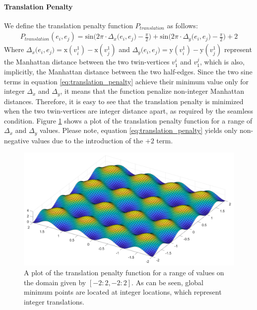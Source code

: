 \paragraph{Translation Penalty}
We define the translation penalty function $P_{translation}$ as follows:
\begin{equation}\label{eq:translation_penalty}
\begin{split}
P_{translation}\left(e_i,e_j\right) = \mathrm{sin} \Big( 2\pi\cdot\Delta_x\big(e_i,e_j\big) - \frac{\pi}{2}\Big) + \mathrm{sin} \Big( 2\pi\cdot\Delta_y\big(e_i,e_j\big) - \frac{\pi}{2}\Big) + 2
\end{split}
\end{equation}
Where $\Delta_x\big(e_i,e_j\big) = \mathrm{x}\left(v_i^1\right) - \mathrm{x}\left(v_j^1\right)$ and $\Delta_y\big(e_i,e_j\big) = \mathrm{y}\left(v_i^1\right) - \mathrm{y}\left(v_j^1\right)$ represent the Manhattan distance between the two twin-vertices $v^i_1$ and $v^j_1$, which is also, implicitly, the Manhattan distance between the two half-edges. Since the two sine terms in equation \ref{eq:translation_penalty} achieve their minimum value only for integer $\Delta_x$ and $\Delta_y$, it means that the function penalize non-integer Manhattan distances. Therefore, it is easy to see that the translation penalty is minimized when the two twin-vertices are integer distance apart, as required by the seamless condition. Figure \ref{fig:translation_penalty} shows a plot of the translation penalty function for a range of $\Delta_x$ and $\Delta_y$ values. Please note, equation \ref{eq:translation_penalty} yields only non-negative values due to the introduction of the $+2$ term.
\begin{figure}[ht]
\centering
\includegraphics[width=15cm]{figures/seamless/translation_penalty_function.png}
\caption[The Translation Penalty Function]{A plot of the translation penalty function for a range of values on the domain given by $\left[-2:2, -2:2\right]$. As can be seen, global minimum points are located at integer locations, which represent integer translations.}
\label{fig:translation_penalty}
\end{figure}
